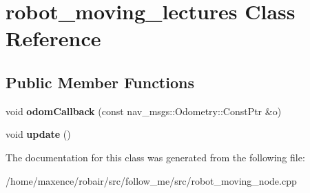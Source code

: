 \hypertarget{classrobot__moving__lectures}{}\section{robot\+\_\+moving\+\_\+lectures Class Reference}
\label{classrobot__moving__lectures}
\subsection*{Public Member Functions}
\begin{DoxyCompactItemize}
\item 
void {\bfseries odom\+Callback} (const nav\+\_\+msgs\+::\+Odometry\+::\+Const\+Ptr \&o)\hypertarget{classrobot__moving__lectures_aa8f39bcbab528b662d0f54a39a8b9716}{}\label{classrobot__moving__lectures_aa8f39bcbab528b662d0f54a39a8b9716}

\item 
void {\bfseries update} ()\hypertarget{classrobot__moving__lectures_a1847c1b0e9c1303c45258fe0f558e441}{}\label{classrobot__moving__lectures_a1847c1b0e9c1303c45258fe0f558e441}

\end{DoxyCompactItemize}


The documentation for this class was generated from the following file\+:\begin{DoxyCompactItemize}
\item 
/home/maxence/robair/src/follow\+\_\+me/src/robot\+\_\+moving\+\_\+node.\+cpp\end{DoxyCompactItemize}
